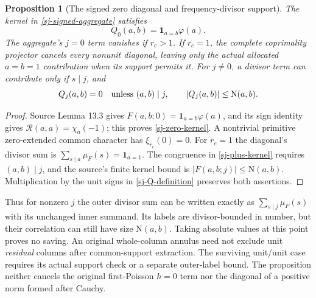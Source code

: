 \documentclass[11pt]{article}
\newtheorem{proposition}[theorem]{Proposition}
\theoremstyle{definition}
\newcommand{\N}{\mathrm N}
\newcommand{\Id}{\mathbf 1}
\begin{document}
\begin{proposition}[The signed zero diagonal and frequency-divisor support]
\label{sj-diagonal-proposition}
The kernel in \eqref{sj-signed-aggregate} satisfies
\begin{equation}\label{sj-zero-kernel}
 Q_0(a,b)=\Id_{a=b}\varphi(a).
\end{equation}
The aggregate's $j=0$ term vanishes if $r_c>1$.  If $r_c=1$, the
complete coprimality projector cancels every nonunit diagonal, leaving
only the actual allocated $a=b=1$ contribution when its support permits it.
For $j\ne0$, a divisor term can contribute only if $s\mid j$, and
\begin{equation}\label{sj-nonzero-kernel}
 Q_j(a,b)=0\quad\hbox{unless }(a,b)\mid j,\qquad
 |Q_j(a,b)|\le\N(a,b).
\end{equation}
\end{proposition}
\begin{proof}
Source Lemma 13.3 gives $F(a,b;0)=\Id_{a=b}\varphi(a)$, and its
sign identity gives $\mathcal R(a,a)=\chi_a(-1)$; this proves
\eqref{sj-zero-kernel}.  A nontrivial primitive zero-extended common
character has $\xi_{r_c}(0)=0$.  For $r_c=1$ the diagonal's divisor sum
is $\sum_{s\mid a}\mu_F(s)=\Id_{a=1}$.  The congruence in
\eqref{sj-plus-kernel} requires $(a,b)\mid j$, and the source's finite
kernel bound is $|F(a,b;j)|\le\N(a,b)$.  Multiplication by the unit
signs in \eqref{sj-Q-definition} preserves both assertions.
\end{proof}
Thus for nonzero $j$ the outer divisor sum can be written exactly as
$\sum_{s\mid j}\mu_F(s)$ with its unchanged inner summand.  Its labels
are divisor-bounded in number, but their correlation can still have size
$\N(a,b)$.  Taking absolute values at this point proves no saving.
An original whole-column annulus need not exclude unit \emph{residual}
columns after common-support extraction.  The surviving unit/unit case
requires its actual support check or a separate outer-label bound.
The proposition neither cancels the original first-Poisson $h=0$ term
nor the diagonal of a positive norm formed after Cauchy.
\end{document}
